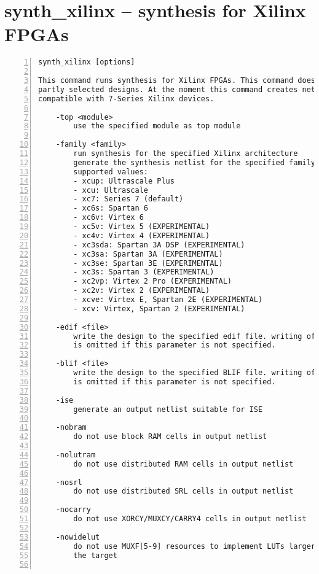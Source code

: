 \section{synth\_xilinx -- synthesis for Xilinx FPGAs}
\label{cmd:synth_xilinx}
\begin{lstlisting}[numbers=left,frame=single]
    synth_xilinx [options]

This command runs synthesis for Xilinx FPGAs. This command does not operate on
partly selected designs. At the moment this command creates netlists that are
compatible with 7-Series Xilinx devices.

    -top <module>
        use the specified module as top module

    -family <family>
        run synthesis for the specified Xilinx architecture
        generate the synthesis netlist for the specified family.
        supported values:
        - xcup: Ultrascale Plus
        - xcu: Ultrascale
        - xc7: Series 7 (default)
        - xc6s: Spartan 6
        - xc6v: Virtex 6
        - xc5v: Virtex 5 (EXPERIMENTAL)
        - xc4v: Virtex 4 (EXPERIMENTAL)
        - xc3sda: Spartan 3A DSP (EXPERIMENTAL)
        - xc3sa: Spartan 3A (EXPERIMENTAL)
        - xc3se: Spartan 3E (EXPERIMENTAL)
        - xc3s: Spartan 3 (EXPERIMENTAL)
        - xc2vp: Virtex 2 Pro (EXPERIMENTAL)
        - xc2v: Virtex 2 (EXPERIMENTAL)
        - xcve: Virtex E, Spartan 2E (EXPERIMENTAL)
        - xcv: Virtex, Spartan 2 (EXPERIMENTAL)

    -edif <file>
        write the design to the specified edif file. writing of an output file
        is omitted if this parameter is not specified.

    -blif <file>
        write the design to the specified BLIF file. writing of an output file
        is omitted if this parameter is not specified.

    -ise
        generate an output netlist suitable for ISE

    -nobram
        do not use block RAM cells in output netlist

    -nolutram
        do not use distributed RAM cells in output netlist

    -nosrl
        do not use distributed SRL cells in output netlist

    -nocarry
        do not use XORCY/MUXCY/CARRY4 cells in output netlist

    -nowidelut
        do not use MUXF[5-9] resources to implement LUTs larger than native for
        the target


\end{lstlisting}
